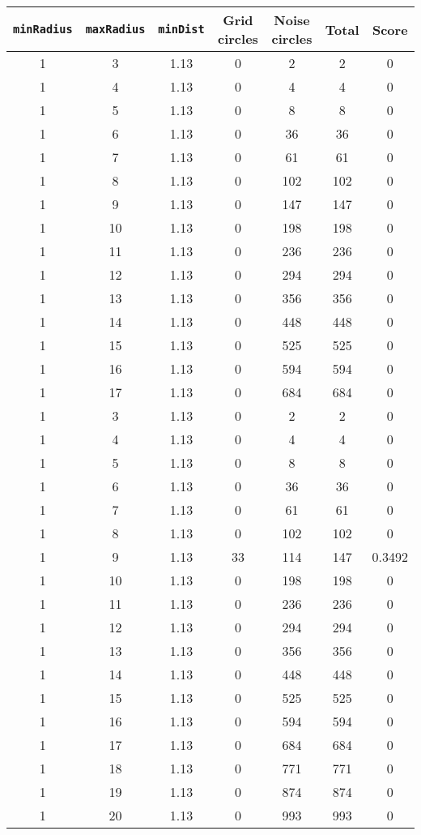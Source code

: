 \documentclass[letterpaper, 12pt]{article}
\begin{document}
\begin{longtable}{|c|c|c|c|c|c|c|}
\hline
\textbf{\texttt{minRadius}} & \textbf{\texttt{maxRadius}} & \textbf{\texttt{minDist}} & \textbf{Grid circles} & \textbf{Noise circles} & \textbf{Total} & \textbf{Score} \\
\hline
1 & 3 & 1.13 & 0 & 2 & 2 & 0 \\
\hline
1 & 4 & 1.13 & 0 & 4 & 4 & 0 \\
\hline
1 & 5 & 1.13 & 0 & 8 & 8 & 0 \\
\hline
1 & 6 & 1.13 & 0 & 36 & 36 & 0 \\
\hline
1 & 7 & 1.13 & 0 & 61 & 61 & 0 \\
\hline
1 & 8 & 1.13 & 0 & 102 & 102 & 0 \\
\hline
1 & 9 & 1.13 & 0 & 147 & 147 & 0 \\
\hline
1 & 10 & 1.13 & 0 & 198 & 198 & 0 \\
\hline
1 & 11 & 1.13 & 0 & 236 & 236 & 0 \\
\hline
1 & 12 & 1.13 & 0 & 294 & 294 & 0 \\
\hline
1 & 13 & 1.13 & 0 & 356 & 356 & 0 \\
\hline
1 & 14 & 1.13 & 0 & 448 & 448 & 0 \\
\hline
1 & 15 & 1.13 & 0 & 525 & 525 & 0 \\
\hline
1 & 16 & 1.13 & 0 & 594 & 594 & 0 \\
\hline
1 & 17 & 1.13 & 0 & 684 & 684 & 0 \\
\hline
1 & 3 & 1.13 & 0 & 2 & 2 & 0 \\
\hline
1 & 4 & 1.13 & 0 & 4 & 4 & 0 \\
\hline
1 & 5 & 1.13 & 0 & 8 & 8 & 0 \\
\hline
1 & 6 & 1.13 & 0 & 36 & 36 & 0 \\
\hline
1 & 7 & 1.13 & 0 & 61 & 61 & 0 \\
\hline
1 & 8 & 1.13 & 0 & 102 & 102 & 0 \\
\hline
1 & 9 & 1.13 & 33 & 114 & 147 & 0.3492 \\
\hline
1 & 10 & 1.13 & 0 & 198 & 198 & 0 \\
\hline
1 & 11 & 1.13 & 0 & 236 & 236 & 0 \\
\hline
1 & 12 & 1.13 & 0 & 294 & 294 & 0 \\
\hline
1 & 13 & 1.13 & 0 & 356 & 356 & 0 \\
\hline
1 & 14 & 1.13 & 0 & 448 & 448 & 0 \\
\hline
1 & 15 & 1.13 & 0 & 525 & 525 & 0 \\
\hline
1 & 16 & 1.13 & 0 & 594 & 594 & 0 \\
\hline
1 & 17 & 1.13 & 0 & 684 & 684 & 0 \\
\hline
1 & 18 & 1.13 & 0 & 771 & 771 & 0 \\
\hline
1 & 19 & 1.13 & 0 & 874 & 874 & 0 \\
\hline
1 & 20 & 1.13 & 0 & 993 & 993 & 0 \\
\hline
\end{longtable}
\end{document}
